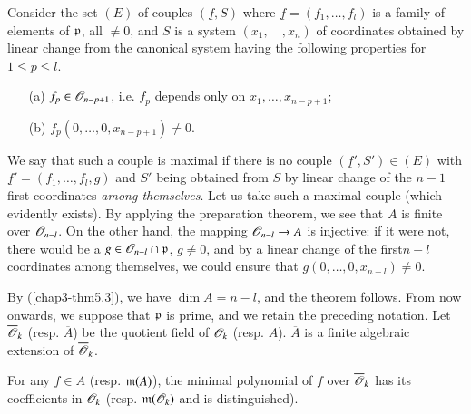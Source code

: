 Consider the set $(E)$ of couples $(\underline{f},S)$ where $\underline{f}=(f_{1},\ldots,f_{l})$ is a family of elements of $\mathfrak{p}$, all $\neq 0$, and $S$ is a system $(x_{1},\quad,x_{n})$ of coordinates obtained by linear change from the canonical system having the following properties for $1\leq p\leq l$.
\begin{itemize}
\item[(a)] $f_{p}\in \mathscr{O}_{n-p+1}$, i.e. $f_{p}$ depends only on $x_{1},\ldots,x_{n-p+1}$; 

\item[(b)] $f_{p}(0,\ldots,0,x_{n-p+1})\neq 0$.
\end{itemize}
We say that such a couple is maximal if there is no couple $(\underline{f}',S')\in (E)$ with $\underline{f}'=(f_{1},\ldots,f_{l},g)$ and $S'$ being obtained from $S$ by linear change of the $n-1$ first coordinates {\em among themselves}. Let us take such a maximal couple (which evidently exists). By applying the preparation theorem, we see that $A$ is finite over $\mathscr{O}_{n-l}$. On the other hand, the mapping $\mathscr{O}_{n-l}\to A$ is injective: if it were not, there would be a $g\in \mathscr{O}_{n-l}\cap \mathfrak{p}$, $g\neq 0$, and by a linear change of the first\pageoriginale $n-l$ coordinates among themselves, we could ensure that $g(0,\ldots,0,x_{n-l})\neq 0$.

By (\ref{chap3-thm5.3}), we have $\dim A=n-l$, and the theorem follows. From now onwards, we suppose that $\mathfrak{p}$ is prime, and we retain the preceding notation. Let $\overline{\mathscr{O}}_{k}$ (resp. $\overline{A}$) be the quotient field of $\mathscr{O}_{k}$ (resp. $A$). $\overline{A}$ is a finite algebraic extension of $\overline{\mathscr{O}}_{k}$.

\begin{proposition}\label{chap3-prop5.6}
For any $f\in A$ (resp. $\mathfrak{m}(A)$), the minimal polynomial of $f$ over $\overline{\mathscr{O}}_{k}$ has its coefficients in $\mathscr{O}_{k}$ (resp. $\mathfrak{m}(\mathscr{O}_{k})$ and is distinguished).
\end{proposition}


